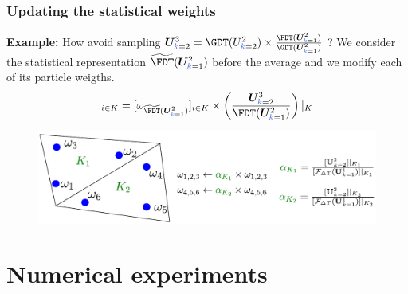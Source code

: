 \documentclass[aspectratio=169]{beamer}
\begin{document}
%
\begin{frame}
  \frametitle{Updating the statistical weights}
  \textcolor{cadmiumgreen}{\textbf{Example:}} How avoid sampling ${\bm U}_{\kk=2}^3 = \GDT(U_{\kk=2}^2) \times \frac{\FDT({\bm U}_{\kk=1}^2)}{\GDT({\bm U}_{\kk=1}^2)}$ ?
  We consider the statistical representation $\widetilde{\FDT}({\bm U}_{\kk=1}^2)$ before the average and we modify each of its particle weigths.
  \begin{equation*}
[\omega_{\kk=2}^3]_{i\in K} = [\omega_{\widetilde{\FDT}({\bm U}_{\kk=1}^2)}]_{i \in K} \times \left(\frac{{\bm U}_{\kk=2}^3}{\FDT({\bm U}_{\kk=1}^2)} \right)|_{K}
    \end{equation*}
  \begin{figure}
    \centering
    \includegraphics[scale=0.6]{image/reweighting}
  \end{figure}
  \end{frame}

%
\section{Numerical experiments}
\end{document}
